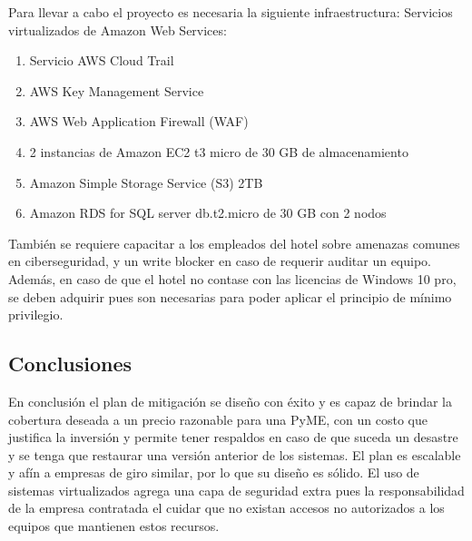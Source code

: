 \documentclass[10pt]{article}
\begin{document}
Para llevar a cabo el proyecto es necesaria la siguiente infraestructura:
Servicios virtualizados de Amazon Web Services: 
\begin{enumerate}
    \item Servicio AWS Cloud Trail
    \item AWS Key Management Service
    \item AWS Web Application Firewall (WAF)
    \item 2 instancias de Amazon EC2 t3 micro de 30 GB de almacenamiento 
    \item Amazon Simple Storage Service (S3) 2TB
    \item Amazon RDS for SQL server db.t2.micro de 30 GB con 2 nodos 
\end{enumerate}

También se requiere capacitar a los empleados del hotel sobre amenazas comunes en ciberseguridad, y un write blocker en caso de requerir auditar un equipo. Además, en caso de que el hotel no contase con las licencias de Windows 10 pro, se deben adquirir pues son necesarias para poder aplicar el principio de mínimo privilegio. 

\subsection{Conclusiones}

En conclusión el plan de mitigación se diseño con éxito y es capaz de brindar la cobertura deseada a un precio razonable para una PyME, con un costo que justifica la inversión y permite tener respaldos en caso de que suceda un desastre y se tenga que restaurar una versión anterior de los sistemas. El plan es escalable y afín a empresas de giro similar, por lo que su diseño es sólido. El uso de sistemas virtualizados agrega una capa de seguridad extra pues la responsabilidad de la empresa contratada el cuidar que no existan accesos no autorizados a los equipos que mantienen estos recursos. 



\newpage



\end{document}

